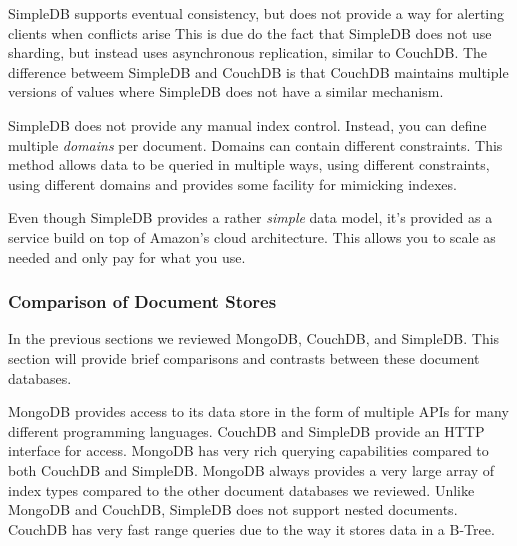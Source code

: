 \documentclass[]{article}
\begin{document}
SimpleDB supports eventual consistency, but does not provide a way for alerting clients when conflicts arise This is due do the fact that SimpleDB does not use sharding, but instead uses asynchronous replication, similar to CouchDB. The difference betweem SimpleDB and CouchDB is that CouchDB maintains multiple versions of values where SimpleDB does not have a similar mechanism.

SimpleDB does not provide any manual index control. Instead, you can define multiple \textit{domains} per document. Domains can contain different constraints. This method allows data to be queried in multiple ways, using different constraints, using different domains and provides some facility for mimicking indexes.

Even though SimpleDB provides a rather \textit{simple} data model, it's provided as a service build on top of Amazon's cloud architecture. This allows you to scale as needed and only pay for what you use. 

\subsubsection{Comparison of Document Stores}
In the previous sections we reviewed MongoDB, CouchDB, and SimpleDB. This section will provide brief comparisons and contrasts between these document databases.

MongoDB provides access to its data store in the form of multiple APIs for many different programming languages. CouchDB and SimpleDB provide an HTTP interface for access. MongoDB has very rich querying capabilities compared to both CouchDB and SimpleDB. MongoDB always provides a very large array of index types compared to the other document databases we reviewed. Unlike MongoDB and CouchDB, SimpleDB does not support nested documents. CouchDB has very fast range queries due to the way it stores data in a B-Tree.
\end{document}
